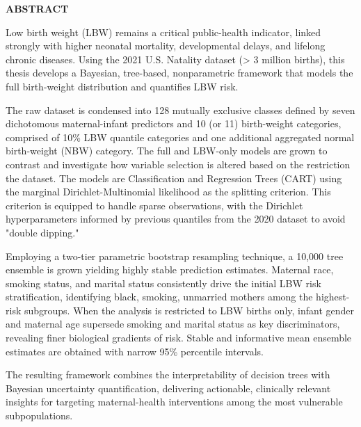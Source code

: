 \begin{center}
    {\large \textbf{ABSTRACT}}
\end{center}

Low birth weight (LBW) remains a critical public-health indicator, linked strongly with higher neonatal mortality, developmental delays, and lifelong chronic diseases. Using the 2021 U.S. Natality dataset (> 3 million births), this thesis develops a Bayesian, tree-based, nonparametric framework that models the full birth-weight distribution and quantifies LBW risk. 

The raw dataset is condensed into 128 mutually exclusive classes defined by seven dichotomous maternal-infant predictors and 10 (or 11) birth-weight categories, comprised of 10\% LBW quantile categories and one additional aggregated normal birth-weight (NBW) category. The full and LBW-only models are grown to contrast and investigate how variable selection is altered based on the restriction the dataset. The models are  Classification and Regression Trees (CART) using the marginal Dirichlet-Multinomial likelihood as the splitting criterion. This criterion is equipped to handle sparse observations, with the Dirichlet hyperparameters informed by previous quantiles from the 2020 dataset to avoid "double dipping."

Employing a two-tier parametric bootstrap resampling technique, a 10,000 tree ensemble is grown yielding highly stable prediction estimates. Maternal race, smoking status, and marital status consistently drive the initial LBW risk stratification, identifying black, smoking, unmarried mothers among the highest-risk subgroups. When the analysis is restricted to LBW births only, infant gender and maternal age supersede smoking and marital status as key discriminators, revealing finer biological gradients of risk. Stable and informative mean ensemble estimates are obtained with narrow 95\% percentile intervals.

The resulting framework combines the interpretability of decision trees with Bayesian uncertainty quantification, delivering actionable, clinically relevant insights for targeting maternal-health interventions among the most vulnerable subpopulations.
